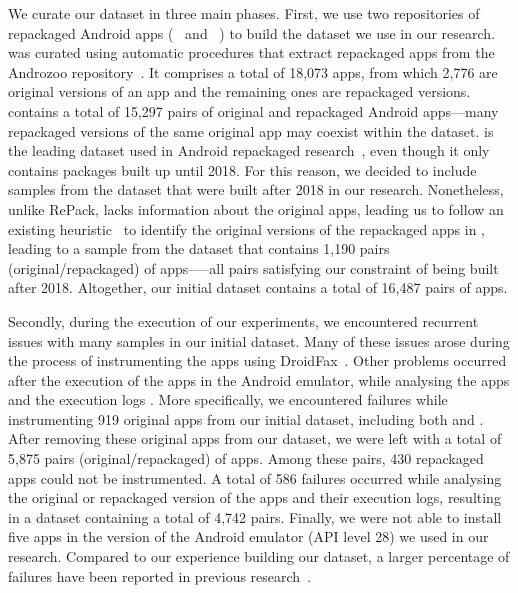 We curate our dataset in three main phases. 
First, we use two repositories of repackaged Android apps (\repack~\cite{DBLP:journals/tse/LiBK21} and \amc~\cite{rafiq2022andromalpack}) to build the
dataset we use in our research. \repack was curated using automatic procedures that extract repackaged apps from the Androzoo
repository~\cite{DBLP:conf/msr/AllixBKT16}. It comprises a total of 18,073 apps, from which 2,776 are original versions of an app and the remaining ones are repackaged versions. \repack contains a total of 15,297 pairs of original and repackaged Android
apps---many repackaged versions of the same original app may coexist within the \repack dataset. \repack is the leading dataset used in Android
repackaged research~\cite{DBLP:journals/ese/KhanmohammadiEH19}, even though it only contains packages built up until 2018. For this reason, we decided to include samples from the \amc
dataset that were built after 2018 in our research. Nonetheless, unlike RePack, \amc lacks information about the original apps, leading
us to follow an existing heuristic~\cite{DBLP:journals/tse/LiBK21} to identify the original versions of the repackaged apps in \amc,
leading to a sample from the \amc dataset that contains 1,190 pairs (original/repackaged) of apps—--all pairs
satisfying our constraint of being built after 2018. Altogether, our initial dataset contains a total of 16,487 pairs of apps.


Secondly, during the execution of our experiments, we encountered recurrent issues with many samples in our initial dataset. Many of these issues arose during the process of instrumenting the apps using DroidFax~\cite{DBLP:conf/icsm/CaiR17a}.
Other problems occurred after the execution of the apps in the Android emulator, while analysing the apps and the execution logs .
More specifically, we encountered failures while instrumenting 919 original apps from our initial dataset, including both \repack and \amc. After removing these original apps
from our dataset, we were left with a total of 5,875 pairs (original/repackaged) of apps. Among these pairs, 430 repackaged apps could not be instrumented.
A total of 586 failures occurred while analysing the original or repackaged version of the apps and their execution logs, resulting in a dataset containing a total of 4,742 pairs.
Finally, we were not able to install five apps in the version of the Android emulator (API level 28) we used in our research.
Compared to our experience building our dataset, a larger percentage of failures have been reported in previous research~\cite{DBLP:conf/wcre/BaoLL18}.



